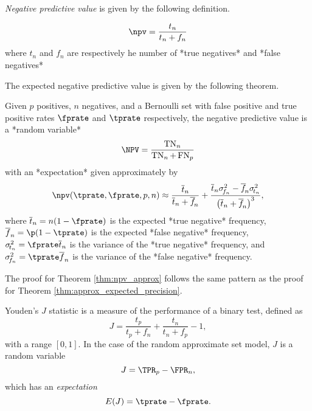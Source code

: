 \documentclass[
]{article}
\begin{document}
\emph{Negative predictive value} is given by the following definition.

\begin{definition}
$$
\npv = \frac{t_n}{t_n + f_n}
$$
where $t_n$ and $f_n$ are respectively he number of *true negatives* 
and *false negatives* 
\end{definition}

The expected negative predictive value is given by the following
theorem.

\begin{theorem}
\label{thm:npv_approx}
Given $p$ positives, $n$ negatives, and a Bernoulli set with false positive and
true positive rates $\fprate$ and $\tprate$ respectively, the negative
predictive value is a *random variable*
$$
\NPV = \frac{\operatorname{TN}_n}{\operatorname{TN}_n + \operatorname{FN}_p}
$$
with an *expectation* given approximately by
\begin{equation}
\label{eq:npv_approx}
\npv(\tprate, \fprate,p,n) \approx 
\frac{\overline{t}_n}{\overline{t}_n + \overline{f}_{\!n}} +
\frac{\overline{t}_n \sigma_{\!f_n}^2 - \overline{f}_{\!n} 
    \sigma_{\!t_n}^2}{\left(\overline{t}_n + \overline{f}_{\!n}\right)^3},
\end{equation}
where $\overline{t}_n = n(1-\fprate)$ is the expected *true negative*
frequency, $\overline{f}_n =  \p(1-\tprate)$ is the expected
*false negative* frequency, $\sigma_{\!t_n}^2 = \fprate \overline{t}_n$ is the
variance of the *true negative* frequency, and
$\sigma_{\!f_n}^2 = \tprate\overline{f}_n$ is the variance of the
*false negative* frequency.
\end{theorem}

The proof for Theorem \ref{thm:npv_approx} follows the same pattern as
the proof for Theorem \ref{thm:approx_expected_precision}.

Youden's \(J\) statistic is a measure of the performance of a binary
test, defined as \begin{equation}
J = \frac{t_p}{t_p + f_n} + \frac{t_n}{t_n + f_p} - 1,
\end{equation} with a range \([0,1]\). In the case of the random
approximate set model, \(J\) is a random variable \begin{equation}
J = \TPR_p - \FPR_n,
\end{equation} which has an \emph{expectation} \begin{equation}
E(J) = \tprate - \fprate.
\end{equation}
\end{document}
